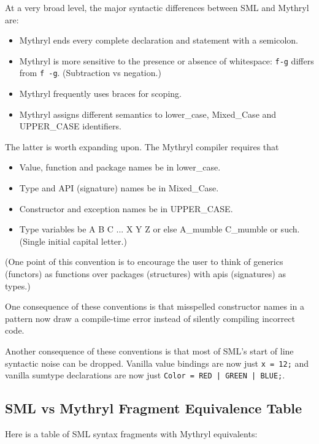 At a very broad level, the major syntactic differences between {\sc SML} and Mythryl are: 
\begin{itemize}
\item Mythryl ends every complete declaration and statement with a semicolon.
\item Mythryl is more sensitive to the presence or absence of whitespace: {\tt f-g} differs from {\tt f -g}. (Subtraction vs negation.)
\item Mythryl frequently uses braces for scoping.
\item Mythryl assigns different semantics to lower\_case, Mixed\_Case and UPPER\_CASE identifiers.
\end{itemize}

The latter is worth expanding upon.  The Mythryl compiler requires that 
\begin{itemize}
\item Value, function and package names be in lower\_case.
\item Type and API (signature) names be in Mixed\_Case.
\item Constructor and exception names be in UPPER\_CASE.
\item Type variables be A B C ... X Y Z or else A\_mumble C\_mumble or such. (Single initial capital letter.)
\end{itemize}

(One point of this convention is to encourage the user to think of 
generics (functors) as functions over packages (structures) with 
apis (signatures) as types.)

One consequence of these conventions is that misspelled constructor names 
in a pattern now draw a compile-time error instead of silently compiling 
incorrect code.

Another consequence of these conventions is that most of {\sc SML}'s 
start of line syntactic noise can be dropped.  Vanilla 
value bindings are now just {\tt x = 12;} and vanilla sumtype 
declarations are now just {\tt Color = RED | GREEN | BLUE;}. 

\cutend*

\subsection{SML vs Mythryl Fragment Equivalence Table}

Here is a table of SML syntax fragments with Mythryl equivalents: 

